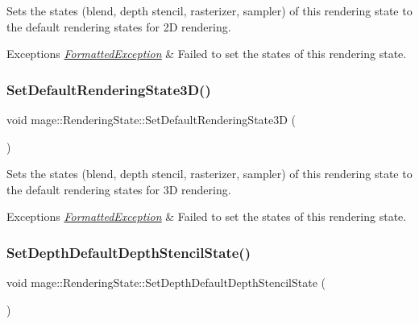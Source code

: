 Sets the states (blend, depth stencil, rasterizer, sampler) of this rendering state to the default rendering states for 2D rendering.


\begin{DoxyExceptions}{Exceptions}
{\em \hyperlink{structmage_1_1_formatted_exception}{Formatted\+Exception}} & Failed to set the states of this rendering state. \\
\hline
\end{DoxyExceptions}
\hypertarget{structmage_1_1_rendering_state_ac6029d9fdc873317b97f60d59b88e7a7}{}\label{structmage_1_1_rendering_state_ac6029d9fdc873317b97f60d59b88e7a7} 
\subsubsection{\texorpdfstring{Set\+Default\+Rendering\+State3\+D()}{SetDefaultRenderingState3D()}}
{\footnotesize\ttfamily void mage\+::\+Rendering\+State\+::\+Set\+Default\+Rendering\+State3D (\begin{DoxyParamCaption}{ }\end{DoxyParamCaption})}

Sets the states (blend, depth stencil, rasterizer, sampler) of this rendering state to the default rendering states for 3D rendering.


\begin{DoxyExceptions}{Exceptions}
{\em \hyperlink{structmage_1_1_formatted_exception}{Formatted\+Exception}} & Failed to set the states of this rendering state. \\
\hline
\end{DoxyExceptions}
\hypertarget{structmage_1_1_rendering_state_a88933420c94d4127973d8148ccd97e86}{}\label{structmage_1_1_rendering_state_a88933420c94d4127973d8148ccd97e86} 
\subsubsection{\texorpdfstring{Set\+Depth\+Default\+Depth\+Stencil\+State()}{SetDepthDefaultDepthStencilState()}}
{\footnotesize\ttfamily void mage\+::\+Rendering\+State\+::\+Set\+Depth\+Default\+Depth\+Stencil\+State (\begin{DoxyParamCaption}{ }\end{DoxyParamCaption})}

